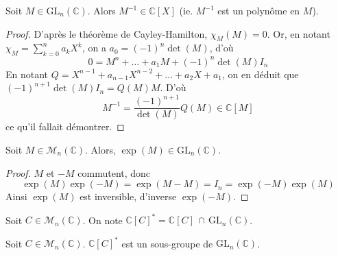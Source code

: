 






  \begin{lemma}
    \label{surjectivite-de-l-exponentielle-1}
    Soit $M \in \mathrm{GL}_n(\mathbb{C})$. Alors $M^{-1} \in \mathbb{C}[X]$ (ie. $M^{-1}$ est un polynôme en $M$).
  \end{lemma}

  \begin{proof}
    D'après le théorème de Cayley-Hamilton, $\chi_M(M) = 0$. Or, en notant $\chi_M = \sum_{k=0}^n a_k X^k$, on a $a_0 = (-1)^n \det(M)$, d'où
    \[ 0 = M^n + \dots + a_1 M + (-1)^n \det(M) I_n \]
    En notant $Q = X^{n-1} + a_{n-1}X^{n-2} + \dots + a_2 X + a_1$, on en déduit que $(-1)^{n+1} \det(M) I_n = Q(M)M$. D'où
    \[ M^{-1} = \frac{(-1)^{n+1}}{\det(M)} Q(M) \in \mathbb{C}[M] \]
    ce qu'il fallait démontrer.
  \end{proof}

  \begin{lemma}
    \label{surjectivite-de-l-exponentielle-2}
    Soit $M \in \mathcal{M}_n(\mathbb{C})$. Alors, $\exp(M) \in \mathrm{GL}_n(\mathbb{C})$.
  \end{lemma}

  \begin{proof}
    $M$ et $-M$ commutent, donc
    \[ \exp(M)\exp(-M) = \exp(M-M) = I_n = \exp(-M)\exp(M) \]
    Ainsi $\exp(M)$ est inversible, d'inverse $\exp(-M)$.
  \end{proof}

  \begin{notation}
    Soit $C \in \mathcal{M}_n(\mathbb{C})$. On note $\mathbb{C}[C]^* = \mathbb{C}[C] \, \cap \, \mathrm{GL}_n(\mathbb{C})$.
  \end{notation}

  \begin{lemma}
    \label{surjectivite-de-l-exponentielle-3}
    Soit $C \in \mathcal{M}_n(\mathbb{C})$. $\mathbb{C}[C]^*$ est un sous-groupe de $\mathrm{GL}_n(\mathbb{C})$.
  \end{lemma}


